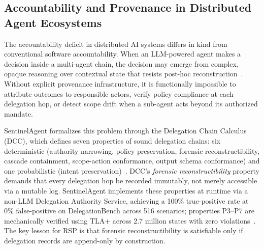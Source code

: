 \subsection{Accountability and Provenance in Distributed Agent Ecosystems}
\label{sec:accountability}

The accountability deficit in distributed AI systems differs in kind from conventional software accountability. When an LLM-powered agent makes a decision inside a multi-agent chain, the decision may emerge from complex, opaque reasoning over contextual state that resists post-hoc reconstruction~\cite{dzone2025accountability}. Without explicit provenance infrastructure, it is functionally impossible to attribute outcomes to responsible actors, verify policy compliance at each delegation hop, or detect scope drift when a sub-agent acts beyond its authorized mandate.

SentinelAgent formalizes this problem through the Delegation Chain Calculus (DCC), which defines seven properties of sound delegation chains: six deterministic (authority narrowing, policy preservation, forensic reconstructibility, cascade containment, scope-action conformance, output schema conformance) and one probabilistic (intent preservation)~\cite{sentinelagent}. DCC's \emph{forensic reconstructibility} property demands that every delegation hop be recorded immutably, not merely accessible via a mutable log. SentinelAgent implements these properties at runtime via a non-LLM Delegation Authority Service, achieving a 100\% true-positive rate at 0\% false-positive on DelegationBench across 516 scenarios; properties P3--P7 are mechanically verified using TLA+ across 2.7 million states with zero violations~\cite{sentinelagent}. The key lesson for RSP is that forensic reconstructibility is satisfiable only if delegation records are append-only by construction.

